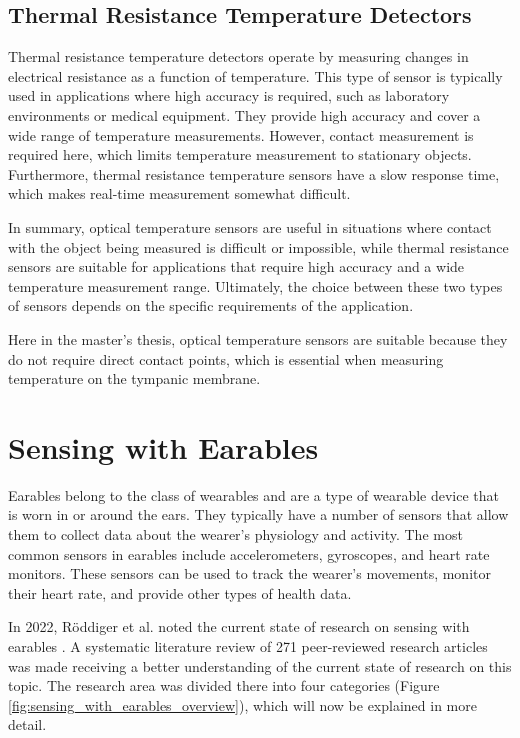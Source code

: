 \subsection{Thermal Resistance Temperature Detectors}
\label{Background:TemperatureSensors:ResistanceTD}
Thermal resistance temperature detectors operate by measuring changes in electrical resistance as a function of temperature. 
This type of sensor is typically used in applications where high accuracy is required, such as laboratory environments or medical equipment.
They provide high accuracy and cover a wide range of temperature measurements.
However, contact measurement is required here, which limits temperature measurement to stationary objects.
Furthermore, thermal resistance temperature sensors have a slow response time, which makes real-time measurement somewhat difficult.

In summary, optical temperature sensors are useful in situations where contact with the object being measured is difficult or impossible, while thermal resistance sensors are suitable for applications that require high accuracy and a wide temperature measurement range. 
Ultimately, the choice between these two types of sensors depends on the specific requirements of the application.

Here in the master's thesis, optical temperature sensors are suitable because they do not require direct contact points, which is essential when measuring temperature on the tympanic membrane.

\section{Sensing with Earables}
\label{Background:SensingWithEarables}
Earables belong to the class of wearables and are a type of wearable device that is worn in or around the ears. 
They typically have a number of sensors that allow them to collect data about the wearer's physiology and activity. 
The most common sensors in earables include accelerometers, gyroscopes, and heart rate monitors. 
These sensors can be used to track the wearer's movements, monitor their heart rate, and provide other types of health data.

In 2022, Röddiger et al. noted the current state of research on sensing with earables \cite{roddigerSensingEarablesSystematic2022a}.
A systematic literature review of 271 peer-reviewed research articles was made receiving a better understanding of the current state of research on this topic.
The research area was divided there into four categories (Figure \ref{fig:sensing_with_earables_overview}), which will now be explained in more detail.

